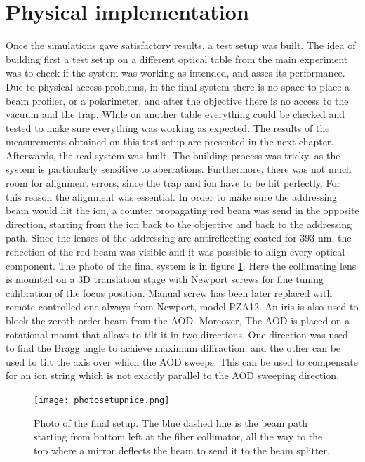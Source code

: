 \section{Physical implementation}
Once the simulations gave satisfactory results, a test setup was built. The idea of building first a test setup on a different optical table from the main experiment was to check if the system was working as intended, and asses its performance. Due to physical access problems, in the final system there is no space to place a beam profiler, or a polarimeter, and after the objective there is no access to the vacuum and the trap. While on another table everything could be checked and tested to make sure everything was working as expected. The results of the measurements obtained on this test setup are presented in the next chapter.\\
Afterwards, the real system was built. The building process was tricky, as the system is particularly sensitive to aberrations. Furthermore, there was not much room for alignment errors, since the trap and ion have to be hit perfectly. For this reason the alignment was essential. In order to make sure the addressing beam would hit the ion, a counter propagating red beam was send in the opposite direction, starting from the ion back to the objective and back to the addressing path. Since the lenses of the addressing are antireflecting coated for 393 nm, the reflection of the red beam was visible and it was possible to align every optical component. The photo of the final system is in figure \ref{photosetup}. Here the collimating lens is mounted on a 3D translation stage with Newport screws for fine tuning calibration of the focus position. Manual screw has been later replaced with remote controlled one always from Newport, model PZA12. An iris is also used to block the zeroth order beam from the AOD. Moreover, The AOD is placed on a rotational mount that allows to tilt it in two directions. One direction was used to find the Bragg angle to achieve maximum diffraction, and the other can be used to tilt the axis over which the AOD sweeps. This can be used to compensate for an ion string which is not exactly parallel to the AOD sweeping direction.

\begin{figure}[H]
\centering
\texttt{[image: photosetupnice.png]}
\caption{Photo of the final setup. The blue dashed line is the beam path starting from bottom left at the fiber collimator, all the way to the top where a mirror deflects the beam to send it to the beam splitter.}
\label{photosetup}
\end{figure}
